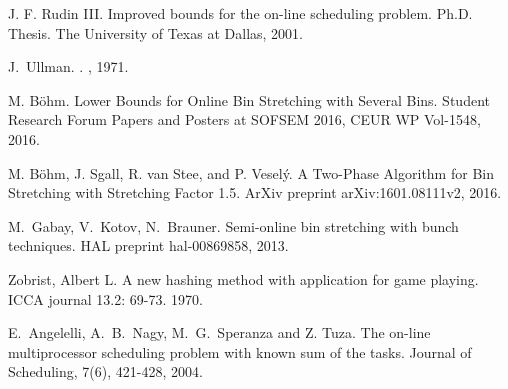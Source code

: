 \begin{thebibliography}{99}
J. F. Rudin III.
\newblock Improved bounds for the on-line scheduling problem.
\newblock Ph.D. Thesis. The University of Texas at Dallas, 2001.

J.~Ullman.
.
, 1971.

M. Böhm.
\newblock Lower Bounds for Online Bin Stretching with Several Bins.
\newblock Student Research Forum Papers and Posters at SOFSEM 2016, CEUR WP Vol-1548,
2016.

M. Böhm, J. Sgall, R. van Stee, and P. Veselý. 
\newblock A Two-Phase Algorithm for Bin Stretching with Stretching Factor 1.5.
\newblock ArXiv preprint arXiv:1601.08111v2,
2016.

M.~Gabay, V.~Kotov, N.~Brauner.
\newblock Semi-online bin stretching with bunch techniques.
\newblock HAL preprint hal-00869858,
2013.

Zobrist, Albert L.
\newblock A new hashing method with application for game playing.
\newblock ICCA journal 13.2: 69-73.
1970.

E.~Angelelli, A.~B.~Nagy, M.~G.~Speranza and Z. Tuza.
\newblock The on-line multiprocessor scheduling problem with known sum of the tasks.
\newblock Journal of Scheduling, 7(6), 421-428,
2004.

\end{thebibliography}